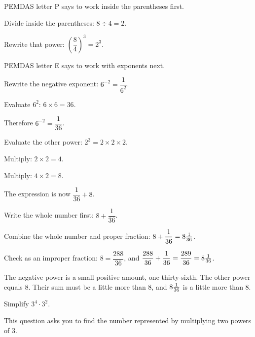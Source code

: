 \begin{steps}
  \item PEMDAS letter P says to work inside the parentheses first.
  \item Divide inside the parentheses: $8 \div 4 = 2$.
  \item Rewrite that power: $\left(\dfrac{8}{4}\right)^{3} = 2^{3}$.
  \item PEMDAS letter E says to work with exponents next.
  \item Rewrite the negative exponent: $6^{-2} = \dfrac{1}{6^{2}}$.
  \item Evaluate $6^{2}$: $6 \times 6 = 36$.
  \item Therefore $6^{-2} = \dfrac{1}{36}$.
  \item Evaluate the other power: $2^{3} = 2 \times 2 \times 2$.
  \item Multiply: $2 \times 2 = 4$.
  \item Multiply: $4 \times 2 = 8$.
  \item The expression is now $\dfrac{1}{36} + 8$.
  \item Write the whole number first: $8 + \dfrac{1}{36}$.
  \item Combine the whole number and proper fraction:
    $8 + \dfrac{1}{36} = 8\tfrac{1}{36}$.
  \item Check as an improper fraction: $8 = \dfrac{288}{36}$, and
    $\dfrac{288}{36} + \dfrac{1}{36} = \dfrac{289}{36} = 8\tfrac{1}{36}$.
\end{steps}


The negative power is a small positive amount, one thirty-sixth. The other power
equals 8. Their sum must be a little more than 8, and $8\tfrac{1}{36}$ is a
little more than 8.


Simplify $3^{4} \cdot 3^{2}$.


This question asks you to find the number represented by multiplying two powers
of 3.

